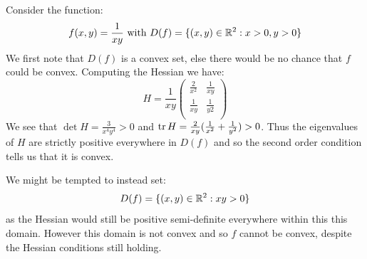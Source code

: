 \documentclass[../main.tex]{subfiles}
\begin{document}
\begin{example}
  Consider the function:
  \[
    f(x, y) = \frac{1}{xy} \text{ with } D(f) = \{(x, y) \in \mathbb{R}^2: x > 0, y > 0\}
  \]
  We first note that $D(f)$ is a convex set, else there would be no chance that $f$ could be convex.
  Computing the Hessian we have:
  \[
    H = \frac{1}{xy} \begin{pmatrix}
    \frac{2}{x^2} & \frac{1}{xy} \\
    \frac{1}{xy} & \frac{1}{y2} \\
    \end{pmatrix}
  \]
  We see that $\det H = \frac{3}{x^{4}y^4} > 0$ and $\operatorname{tr} H = \frac{2}{xy}(\frac{1}{x^2} + \frac{1}{y^2}) > 0$.
  Thus the eigenvalues of $H$ are strictly positive everywhere in $D(f)$ and so the second order condition tells us that it is convex.

  We might be tempted to instead set:
  \[
    D(f) = \{(x, y) \in \mathbb{R}^{2}: xy > 0\}
  \]
  as the Hessian would still be positive semi-definite everywhere within this this domain.
  However this domain is not convex and so $f$ cannot be convex, despite the Hessian conditions still holding.
\end{example}
\end{document}
